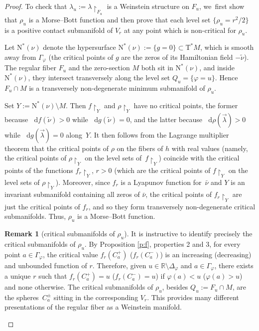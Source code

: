 \documentclass[10pt]{amsart}
\newcommand{\R}{{\mathbb R}}
\newcommand{\Crit}{\Gamma_{\!\varphi}}
\newcommand{\Discr}{\Delta_\varphi}
\newcommand{\sN}{\mathrm{N}^\ast}
\newcommand{\sT}{\mathrm{T}^\ast}
\renewcommand{\d}{\mathop{}\!\mathrm d}
\newcommand{\drho}{\d\rho}
\newcommand{\df}{\d f}
\newcommand{\dg}{\d g}
\newcommand{\hnu}{\tilde\nu}
\newcommand{\cnu}{\bar\nu}
\newcommand{\de}{\mathrel{:=}}
\newcommand{\rst}[1]{{\upharpoonright}_{\!#1}}
\theoremstyle{plain}
\theoremstyle{definition}
\newtheorem{remark}[theorem]{Remark}
\begin{document}
\begin{proof}
To check that $\lambda_u \de \lambda \rst{ F_u }$ is a Weinstein structure on
$F_u$, we~first show that $\rho_u$ is a Morse--Bott function and then prove that
each level set $\{\rho_u = r^2/2\}$ is a positive contact submanifold of $V_r$
at any point which is non-critical for $\rho_u$.

Let $\sN(\nu)$ denote the hypersurface $\sN(\nu) \de \{g=0\} \subset \sT M$,
which is smooth away from $\Crit$ (the critical points of $g$ are the zeros of
its Hamiltonian field $-\hnu$). The regular fiber $F_u$ and the zero-section $M$
both sit in $\sN(\nu)$, and inside $\sN(\nu)$, they intersect transversely along
the level set $Q_u = \{\varphi=u\}$. Hence $F_u \cap M$ is a transversely
non-degenerate minimum submanifold of $\rho_u$.

Set $Y \de \sN(\nu) \setminus M$. Then $f \rst Y$ and $\rho \rst Y$ have no critical
points, the former because $\df(\hnu) > 0$ while $\dg(\hnu) = 0$, and the latter
because $\drho(\vec\lambda) > 0$ while $\dg(\vec\lambda) = 0$ along~$Y$. It then
follows from the Lagrange multiplier theorem that the critical points of $\rho$
on the fibers of $h$ with real values (namely, the critical points of $\rho \rst
Y$ on the level sets of~$f \rst Y$) coincide with the critical points of the
functions $f_r \rst Y$, $r>0$ (which are the critical points of $f \rst Y$ on
the level sets of $\rho \rst Y$). Moreover, since $f_r$ is a Lyapunov function
for~$\cnu$ and $Y$ is an invariant submanifold containing all zeros of $\cnu$,
the critical points of $f_r \rst Y$ are just the critical points of $f_r$, and
so they form transversely non-degenerate critical submanifolds. Thus, $\rho_u$ is
a Morse--Bott function.

\begin{remark}[critical submanifolds of $\rho_u$]
It is instructive to identify precisely the critical submanifolds of $\rho_u$.
By Proposition \ref{p:f}, properties 2 and 3, for every point $a \in \Crit$,
the critical value $f_r(C_a^+)$ (\resp $f_r(C_a^-)$) is an increasing (\resp decreasing) and unbounded function of $r$. Therefore, given $u \in \R \setminus \Discr$
and $a \in \Crit$, there exists a unique $r$ such that $f_r(C_a^+) = u$ (\resp $f_r(C_a^-) = u$) if $\varphi(a) < u$ (\resp $\varphi(a) > u$) and none
otherwise. The critical submanifolds of $\rho_u$, besides $Q_u \de F_u \cap M$,
are the spheres~$C_a^\pm$ sitting in the corresponding $V_r$. This provides many
different presentations of the regular fiber as a Weinstein manifold.
\end{remark}


\end{proof}
\end{document}
